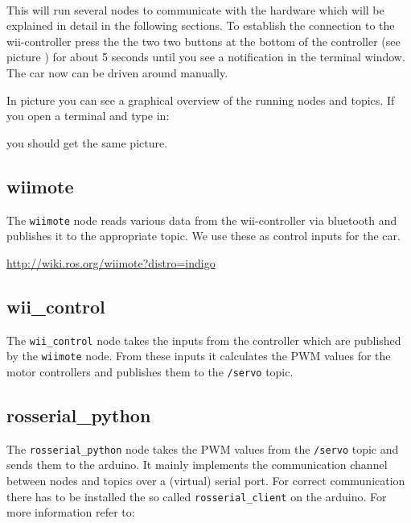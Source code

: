 \\

This will run several nodes to communicate with the hardware which will be explained in detail in the following sections. To establish the connection to the wii-controller press the the two two buttons at the bottom of the controller (see picture ) for about 5 seconds until you see a notification in the terminal window. The car now can be driven around manually.

In picture  you can see a graphical overview of the running nodes and topics. If you open a terminal and type in:


you should get the same picture.


\subsection{wiimote}
\label{sec:tas_package_drivers_wiimote}
The \texttt{wiimote} node reads various data from the wii-controller via bluetooth and publishes it to the appropriate topic. We use these as control inputs for the car.

\hyperref[http://wiki.ros.org/wiimote?distro=indigo]{http://wiki.ros.org/wiimote?distro=indigo}

\subsection{wii\_control}
\label{sec:tas_package_drivers_wii_control}
The \texttt{wii\_control} node takes the inputs from the controller which are published by the \texttt{wiimote} node. From these inputs it calculates the PWM values for the motor controllers and publishes them to the \texttt{/servo} topic.


\subsection{rosserial\_python}
\label{sec:tas_package_drivers_rosserial}
The \texttt{rosserial\_python} node takes the PWM values from the \texttt{/servo} topic and sends them to the arduino. It mainly implements the communication channel between nodes and topics over a (virtual) serial port. For correct communication there has to be installed the so called \texttt{rosserial\_client} on the arduino. For more information refer to:

